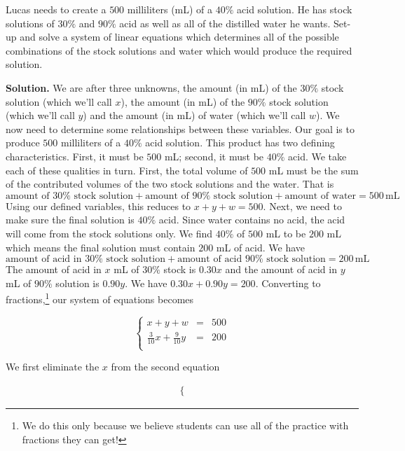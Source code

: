 \begin{ex} \label{lucasmixex} Lucas needs to create a $500$ milliliters (mL) of a $40 \%$ acid solution.  He has stock solutions of $30 \%$ and $90 \%$ acid as well as all of the distilled water he wants. Set-up and solve a system of linear equations which determines all of the possible combinations of the stock solutions and water which would produce the required solution.

\smallskip

{ \bf Solution.}  We are after three unknowns, the amount (in mL) of the $30 \%$ stock solution (which we'll call $x$), the amount (in mL) of the $90 \%$ stock solution (which we'll call $y$) and the amount (in mL) of water (which we'll call $w$). We now need to determine some relationships between these variables.  Our goal is to produce $500$ milliliters of a $40 \%$ acid solution.  This product has two defining characteristics.  First, it must be $500$ mL;  second, it must be $40 \%$ acid.  We take each of these qualities in turn.  First, the total volume of $500$ mL must be the sum of the contributed volumes of the two stock solutions and the water.  That is \[ \mbox{amount of  $30 \%$ stock solution} + \mbox{amount of  $90 \%$ stock solution} + \mbox{amount of water} = 500 \, \mbox{mL}\] Using our defined variables, this reduces to $x+y+w = 500$.  Next, we need to make sure the final solution is $40 \%$ acid.   Since water contains no acid, the acid will come from the stock solutions only.  We find $40 \%$ of $500$ mL to be $200$ mL which means the final solution must contain $200$ mL of acid.  We have \[ \mbox{amount of  acid in $30 \%$ stock solution} + \mbox{amount of acid $90 \%$ stock solution}  = 200 \, \mbox{mL}\]  The amount of acid in  $x$ mL of $30 \%$ stock is $0.30x$ and the amount of acid in $y$ mL of $90 \%$ solution is $0.90y$.  We have $0.30x + 0.90y = 200$.  Converting to fractions,\footnote{We do this only because we believe students can use all of the practice with fractions they can get!} our system of equations becomes 

\[ \left\{ \begin{array}{rcl} x+y+w & = & 500 \\ 
\frac{3}{10}x + \frac{9}{10}y & = & 200 \\ \end{array} \right.\]  

We first eliminate the $x$ from the second equation 

\[\begin{array}{ccc}
\left\{ 


\end{array}\]
\end{ex}
